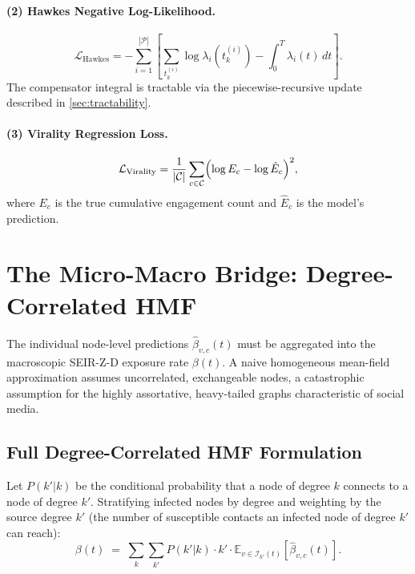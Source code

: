 \documentclass[11pt]{article}
\newcommand{\cI}{\mathcal{I}}
\newcommand{\cC}{\mathcal{C}}
\newcommand{\cP}{\mathcal{P}}
\begin{document}
\paragraph{(2) Hawkes Negative Log-Likelihood.}
\begin{equation}
  \mathcal{L}_{\mathrm{Hawkes}}
  = -\sum_{i=1}^{|\cP|}
  \left[
    \sum_{t_k^{(i)}} \log\lambda_i\!\left(t_k^{(i)}\right)
    - \int_0^T \lambda_i(t)\,dt
  \right].
  \label{eq:hawkes-nll}
\end{equation}
The compensator integral is tractable via the piecewise-recursive update
described in \cref{sec:tractability}.

\paragraph{(3) Virality Regression Loss.}
\begin{equation}
  \mathcal{L}_{\mathrm{Virality}}
  = \frac{1}{|\cC|}
  \sum_{c\in\cC}
  \Bigl(\log E_c - \log\hat{E}_c\Bigr)^2,
  \label{eq:virality-loss}
\end{equation}
where $E_c$ is the true cumulative engagement count and $\hat{E}_c$ is the
model's prediction.

\section{The Micro-Macro Bridge: Degree-Correlated HMF}
\label{sec:hmf}

The individual node-level predictions $\hat{\beta}_{v,c}(t)$ must be aggregated
into the macroscopic SEIR-Z-D exposure rate $\beta(t)$. A naive homogeneous
mean-field approximation assumes uncorrelated, exchangeable nodes, a
catastrophic assumption for the highly assortative, heavy-tailed graphs
characteristic of social media.

\subsection{Full Degree-Correlated HMF Formulation}

Let $P(k'|k)$ be the conditional probability that a node of degree $k$ connects
to a node of degree $k'$. Stratifying infected nodes by degree and weighting by
the source degree $k'$ (the number of susceptible contacts an infected node of
degree $k'$ can reach):
\begin{equation}
  \beta(t)
  \;=\;
  \sum_{k}\sum_{k'}
  P(k'|k)\cdot k'\cdot
  \mathbb{E}_{v\in\cI_{k'}(t)}\!\left[\hat{\beta}_{v,c}(t)\right].
  \label{eq:hmf}
\end{equation}
\end{document}
